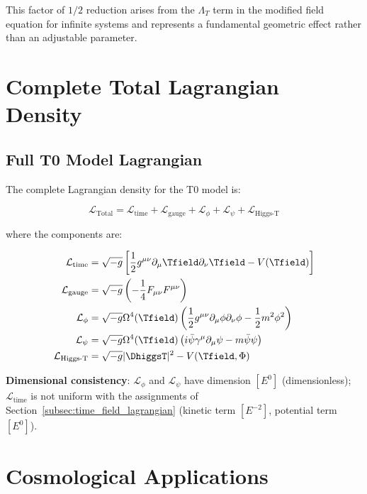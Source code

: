 	This factor of $1/2$ reduction arises from the $\Lambda_T$ term in the modified field equation for infinite systems and represents a fundamental geometric effect rather than an adjustable parameter.
	
	\section{Complete Total Lagrangian Density}
	\label{sec:total_lagrangian}
	
	\subsection{Full T0 Model Lagrangian}
	\label{subsec:full_lagrangian}
	
	The complete Lagrangian density for the T0 model is:
	
	\begin{equation}
		\mathcal{L}_{\text{Total}} = \mathcal{L}_{\text{time}} + \mathcal{L}_{\text{gauge}} + \mathcal{L}_{\phi} + \mathcal{L}_{\psi} + \mathcal{L}_{\text{Higgs-T}}
		\label{eq:total_lagrangian}
	\end{equation}
	
	where the components are:
	
	\begin{align}
		\mathcal{L}_{\text{time}} &= \sqrt{-g} \left[\frac{1}{2} g^{\mu\nu} \partial_\mu \Tfield \partial_\nu \Tfield - V(\Tfield)\right] \\
		\mathcal{L}_{\text{gauge}} &= \sqrt{-g} \left(-\frac{1}{4} F_{\mu\nu} F^{\mu\nu}\right) \\
		\mathcal{L}_{\phi} &= \sqrt{-g} \Omega^4(\Tfield) \left(\frac{1}{2} g^{\mu\nu} \partial_\mu \phi \partial_\nu \phi - \frac{1}{2} m^2 \phi^2\right) \\
		\mathcal{L}_{\psi} &= \sqrt{-g} \Omega^4(\Tfield) \left(i\bar{\psi}\gamma^\mu\partial_\mu\psi - m\bar{\psi}\psi\right) \\
		\mathcal{L}_{\text{Higgs-T}} &= \sqrt{-g} |\DhiggsT|^2 - V(\Tfield, \Phi)
	\end{align}
	
	\textbf{Dimensional consistency}: $\mathcal{L}_{\phi}$ and $\mathcal{L}_{\psi}$ have dimension $[E^0]$ (dimensionless); $\mathcal{L}_{\text{time}}$ is not uniform with the assignments of Section~\ref{subsec:time_field_lagrangian} (kinetic term $[E^{-2}]$, potential term $[E^0]$).
	
	\section{Cosmological Applications}
	\label{sec:cosmological_applications}
	
